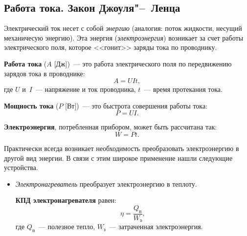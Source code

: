 \documentclass[main.tex]{subfiles}
\begin{document}

\pagestyle{empty}

\begin{NoHyper} %

\setcounter{section}{21
}
\addtocounter{section}{-1} 

\section{Работа тока. Закон Джоуля"--~Ленца}


Электрический ток несет с собой \emph{энергию} (аналогия: поток жидкости, несущий механичесую энергию). 
Эта энергия (\emph{электроэнергия}) возникает за счет работы электрического поля, которое <<гонит>> заряды тока по проводнику. 

\textbf{Работа тока} ($A$ [Дж])~--- это работа электрического поля по передвижению зарядов тока в проводнике:
\begin{equation}
    A=UIt,
\end{equation}
где $U$ и~$I$~--- напряжение и ток проводника, $t$~--- время протекания тока.

\textbf{Мощность тока} ($P$ [Вт])~--- это быстрота совершения работы тока: 
\begin{equation}
    P=UI.
\end{equation}

\textbf{Электроэнергия}, потребленная прибором, может быть рассчитана так:
\begin{equation}
    W=Pt.
\end{equation}

Практически всегда возникает необходимость преобразовать электроэнергию в другой вид энергии. В связи с этим широкое применение нашли следующие устройства.
\begin{itemize}
    \item \emph{Электронагреватель} преобразует электроэнергию в теплоту.

    \textbf{КПД электронагревателя} равен:
    \begin{equation}
        \eta=\frac{Q_\text{п}}{W_\text{з}},
    \end{equation}
    где $Q_\text{п}$~--- полезное тепло, $W_\text{з}$~--- затраченная электроэнергия.


\end{itemize}
\end{NoHyper}
\end{document}

